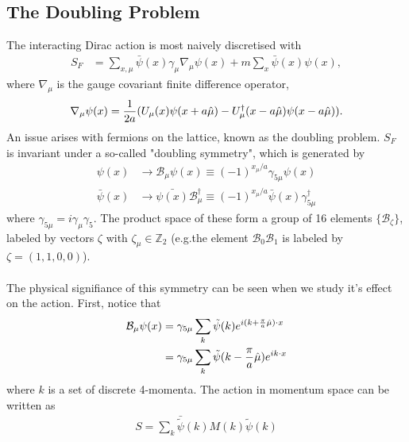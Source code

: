\subsection{The Doubling Problem}

{}

The interacting Dirac action is most naively discretised with
\begin{align}
 S_F &= \sum_{x,\mu} \bar{\psi}(x) \gamma_{\mu} \nabla_{\mu} \psi(x) + m\sum_x \bar{\psi}(x) \psi(x),
 \label{eq:naivefermions}
\end{align}
where $\nabla_{\mu}$ is the gauge covariant finite difference operator,
\begin{align}	
	\nabla_{\mu} \psi(x) = {1\over 2a} ( U_{\mu} (x) \psi(x+a\hat{\mu}) - U^{\dagger}_{\mu}(x-a\hat{\mu})\psi(x-a\hat{\mu}) ).
\label{eq:lat_derivative}
\end{align}
An issue arises with fermions on the lattice, known as the doubling problem. $S_F$ is invariant under a so-called "doubling symmetry", which is generated by
\begin{align}
	\label{eq:doublingsymmetry}
	\psi(x) & \to \mathcal{B}_{\mu} \psi(x) \equiv  (-1)^{x_{\mu}/a} \gamma_{5\mu} \psi(x) \\
	\bar{\psi}(x) & \to \bar{\psi(x)}\mathcal{B}^{\dagger}_{\mu} \equiv (-1)^{x_{\mu}/a} \bar{\psi}(x) \gamma^{\dagger}_{5\mu}
\end{align}
where $\gamma_{5\mu} = i\gamma_{\mu}\gamma_5$. The product space of these form a group of 16 elements $\{\mathcal{B}_{\zeta}\}$, labeled  by vectors $\zeta$ with $\zeta_{\mu}\in \mathbb{Z}_2$ (e.g.the element $\mathcal{B}_{0}\mathcal{B}_{1}$ is labeled by $\zeta=(1,1,0,0)$).
\\ \\
The physical signifiance of this symmetry can be seen when we study it's effect on the action. First, notice that
\begin{align}
	\mathcal{B}_{\mu} \psi(x) & = \gamma_{5\mu} \sum_k \tilde{\psi}(k) e^{i(k+{\pi\over a}\hat{\mu})\cdot x} \\
	& = \gamma_{5\mu} \sum_k \tilde{\psi}(k-{\pi\over a}\hat{\mu})e^{ik\cdot x}
\end{align}
where $k$ is a set of discrete 4-momenta. The action in momentum space can be written as
\begin{align}
	S = \sum_k \bar{\tilde{\psi}}(k) M(k) \tilde{\psi}(k)
\end{align}
